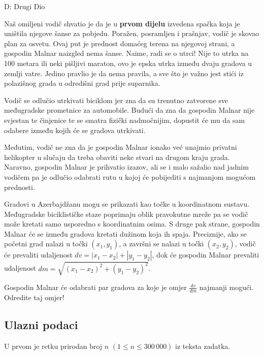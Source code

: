 \begin{statement}[
  timelimit=1 s,
  memorylimit=512 MiB,
]{D: Drugi Dio}

Naš omiljeni vodič shvatio je da je u \textbf{prvom dijelu} izvedena spačka
koja je uništila njegove šanse za pobjedu. Poražen, posramljen i prašnjav,
vodič je skovao plan za osvetu. Ovaj put je prednost domaćeg terena na njegovoj
strani, a gospodin Malnar naizgled nema šanse. Naime, radi se o utrci!
Nije to utrka na 100 metara ili neki pišljivi maraton, ovo je epska utrka
između dvaju gradova u zemlji vatre. Jedino pravlio je da nema pravila, a sve
što je važno jest stići iz polazišnog grada u odredišni grad prije suparnika.

Vodič se odlučio utrkivati biciklom jer zna da su trenutno zatvorene sve
međugradske prometnice za automobile. Budući da zna da gospodin Malnar nije
svjestan te činjenice te se smatra fizički nadmočnijim, dopustit će mu da sam
odabere između kojih će se gradova utrkivati.

Međutim, vodič ne zna da je gospodin Malnar ionako već unajmio privatni
helikopter u slučaju da treba obaviti neke stvari na drugom kraju grada.
Naravno, gospodin Malnar je prihvatio izazov, ali se i malo sažalio nad
jadnim vodičem pa je odlučio odabrati rutu u kojoj će pobijediti s najmanjom
mogućom prednosti.

Gradovi u Azerbajdžanu mogu se prikazati kao točke u koordinatnom sustavu.
Međugradske biciklističke staze poprimaju oblik pravokutne mreže pa se vodič
može kretati samo usporedno s koordinatnim osima. S druge pak strane,
gospodin Malnar će se između gradova kretati dužinom koja ih spaja.
Preciznije, ako se početni grad nalazi u točki $(x_1, y_1)$, a završni se
nalazi u točki $(x_2, y_2)$, vodič će prevaliti udaljenost $dv = |x_1 - x_2|
+ |y_1 - y_2|$, dok će gospodin Malnar prevaliti udaljenost $dm =
\sqrt{(x_1-x_2)^2 + (y_1-y_2)^2}$.

Gospodin Malnar će odabrati par gradova za koje je omjer $\frac{dv}{dm}$
najmanji mogući. Odredite taj omjer!

\subsection*{Ulazni podaci}
U prvom je retku prirodan broj $n$ $(1 \le n \le 300\,000)$ iz teksta
zadatka.


\end{statement}
